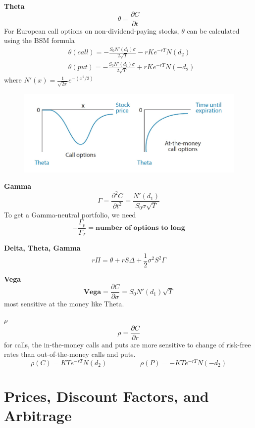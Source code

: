 \documentclass[11pt,fleqn]{book} %
\numberwithin{equation}{section} %
\numberwithin{figure}{section} %
\numberwithin{table}{section} %
\begin{document}
\begin{definition}\textbf{Theta}\\
$$
\theta=\frac{\partial C}{\partial t}
$$
For European call options on non-dividend-paying stocks, $\theta$ can be calculated using the BSM formula
\begin{align*}
    &\theta(call)=-\frac{S_0N'(d_1)\sigma}{2\sqrt{T}}-rKe^{-rT}N(d_2)\\
    &\theta(put)=-\frac{S_0N'(d_1)\sigma}{2\sqrt{T}}+rKe^{-rT}N(-d_2)
\end{align*}
where $N'(x)=\frac{1}{\sqrt{2\pi}}e^{-(x^2/2)}$
\end{definition}
\begin{figure}[h!]
    \centering
    \includegraphics[scale=1]{theta.PNG}
\end{figure}
\begin{definition}\textbf{Gamma}\\
$$
\Gamma=\frac{\partial^2C}{\partial t^2}=\frac{N'(d_1)}{S_0\sigma\sqrt{T}}
$$
To get a Gamma-neutral portfolio, we need
$$
-\frac{\Gamma_p}{\Gamma_T}=\textbf{number of options to long}
$$
\end{definition}
\begin{theorem}\textbf{Delta, Theta, Gamma}
$$
r\Pi=\theta+rS\Delta+\frac{1}{2}\sigma^2S^2\Gamma
$$
\end{theorem}
\begin{definition}\textbf{Vega}
$$
\textbf{Vega}=\frac{\partial C}{\partial\sigma}=S_0N'(d_1)\sqrt{T}
$$
most sensitive at the money like Theta.
\end{definition}
\begin{definition}\textbf{$\rho$}
$$
\rho=\frac{\partial C}{\partial r}
$$
for calls, the in-the-money calls and puts are more sensitive to change of risk-free rates than out-of-the-money calls and puts.
$$
\rho(C)=KTe^{-rT}N(d_2)\hspace{2cm}\rho(P)=-KTe^{-rT}N(-d_2)
$$
\end{definition}
\chapter{Prices, Discount Factors, and Arbitrage}
\end{document}
